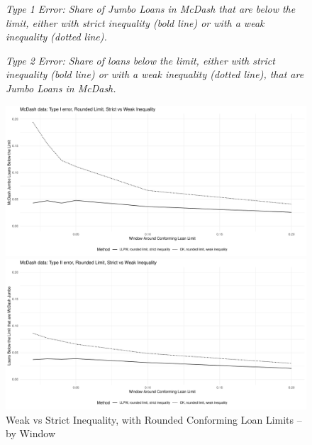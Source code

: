 \documentclass{article}
\begin{document}
\begin{figure}
    
\caption{Weak vs Strict Inequality, with Rounded Conforming Loan Limits -- by Window}

\bigskip

\emph{Type 1 Error: Share of Jumbo Loans in McDash that are below the limit, either with strict inequality (bold line) or with a weak inequality (dotted line).}

\emph{Type 2 Error: Share of loans below the limit, either with strict inequality (bold line) or with a weak inequality (dotted line), that are Jumbo Loans in McDash.}

\begin{center}
    \includegraphics[scale=0.5]{figures/type1error_bywindow_weak_vs_strict.pdf}
\end{center}

\bigskip

\begin{center}
    \includegraphics[scale=0.5]{figures/type2error_bywindow_weak_vs_strict.pdf}
\end{center}

\end{figure}

\clearpage
\pagebreak
\end{document}
